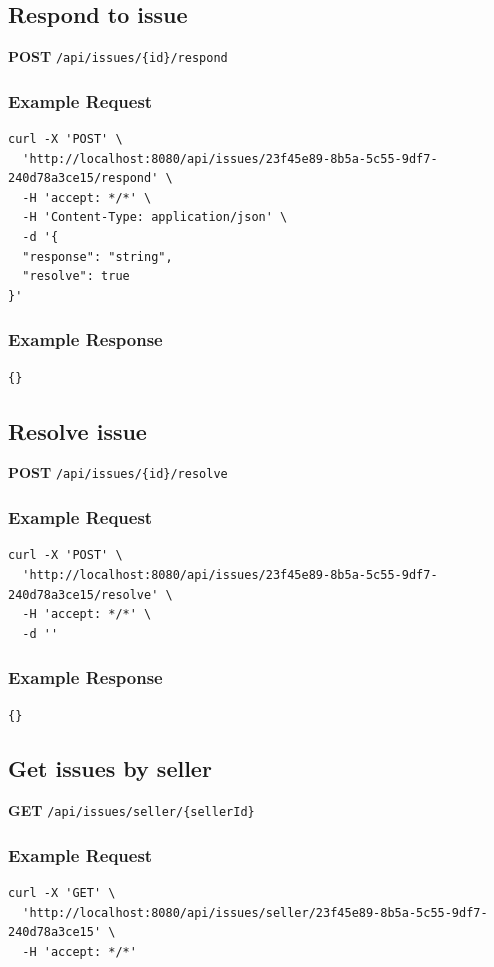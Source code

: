 \documentclass[a4paper,11pt]{article}
\begin{document}
\subsection{Respond to issue}
\textbf{POST} \texttt{/api/issues/\{id\}/respond}
\subsubsection*{Example Request}
\begin{lstlisting}
curl -X 'POST' \
  'http://localhost:8080/api/issues/23f45e89-8b5a-5c55-9df7-240d78a3ce15/respond' \
  -H 'accept: */*' \
  -H 'Content-Type: application/json' \
  -d '{
  "response": "string",
  "resolve": true
}'
\end{lstlisting}

\subsubsection*{Example Response}
\begin{lstlisting}
{}
\end{lstlisting}

\subsection{Resolve issue}
\textbf{POST} \texttt{/api/issues/\{id\}/resolve}
\subsubsection*{Example Request}
\begin{lstlisting}
curl -X 'POST' \
  'http://localhost:8080/api/issues/23f45e89-8b5a-5c55-9df7-240d78a3ce15/resolve' \
  -H 'accept: */*' \
  -d ''
\end{lstlisting}

\subsubsection*{Example Response}
\begin{lstlisting}
{}
\end{lstlisting}

\subsection{Get issues by seller}
\textbf{GET} \texttt{/api/issues/seller/\{sellerId\}}
\subsubsection*{Example Request}
\begin{lstlisting}
curl -X 'GET' \
  'http://localhost:8080/api/issues/seller/23f45e89-8b5a-5c55-9df7-240d78a3ce15' \
  -H 'accept: */*'
\end{lstlisting}
\end{document}
